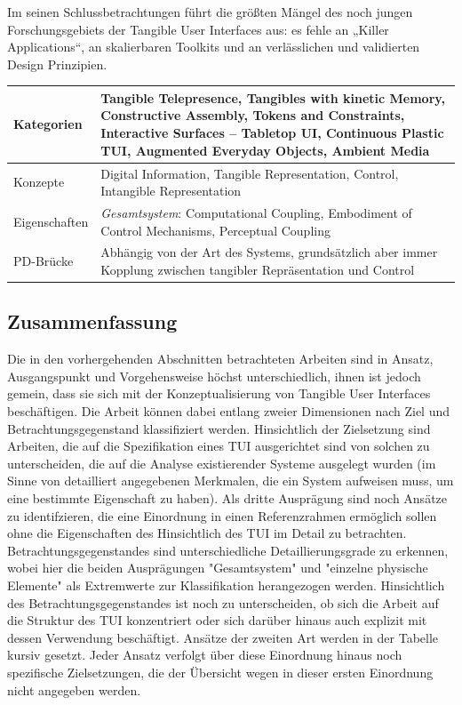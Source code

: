 Im seinen Schlussbetrachtungen führt \citeauthor{Ishii08} die größten Mängel des noch jungen Forschungsgebiets der Tangible User Interfaces aus: es fehle an „Killer Applications“, an skalierbaren Toolkits und an verlässlichen und validierten Design Prinzipien.

\begin{tabular}{| p{3cm} | p{10cm} |}
  \hline
  Kategorien & Tangible Telepresence, Tangibles with kinetic Memory, Constructive Assembly, Tokens and Constraints, Interactive Surfaces -- Tabletop UI, Continuous Plastic TUI, Augmented Everyday Objects, Ambient Media \\ \hline
  Konzepte & Digital Information, Tangible Representation, Control, Intangible Representation \\ \hline
  Eigenschaften & \emph{Gesamtsystem}: Computational Coupling, Embodiment of Control Mechanisms, Perceptual Coupling \\ \hline
  PD-Brücke & Abhängig von der Art des Systems, grundsätzlich aber immer Kopplung zwischen tangibler Repräsentation und Control \\ \hline
\end{tabular} 


\subsection{Zusammenfassung} %
\label{sub:tui_konzepte_zusammenfassung}

Die in den vorhergehenden Abschnitten betrachteten Arbeiten sind in Ansatz, Ausgangspunkt und Vorgehensweise höchst unterschiedlich, ihnen ist jedoch gemein, dass sie sich mit der Konzeptualisierung von Tangible User Interfaces beschäftigen. Die Arbeit können dabei entlang zweier Dimensionen nach Ziel und Betrachtungsgegenstand klassifiziert werden. Hinsichtlich der Zielsetzung sind Arbeiten, die auf die Spezifikation eines \gls{TUI} ausgerichtet sind von solchen zu unterscheiden, die auf die Analyse existierender Systeme ausgelegt wurden (im Sinne von detailliert angegebenen Merkmalen, die ein System aufweisen muss, um eine bestimmte Eigenschaft zu haben). Als dritte Ausprägung sind noch Ansätze zu identifzieren, die eine Einordnung in einen Referenzrahmen ermöglich sollen ohne die Eigenschaften des Hinsichtlich des \gls{TUI} im Detail zu betrachten. Betrachtungsgegenstandes sind unterschiedliche Detaillierungsgrade zu erkennen, wobei hier die beiden Ausprägungen "Gesamtsystem" und "einzelne physische Elemente" als Extremwerte zur Klassifikation herangezogen werden. Hinsichtlich des Betrachtungsgegenstandes ist noch zu unterscheiden, ob sich die Arbeit auf die Struktur des \gls{TUI} konzentriert oder sich darüber hinaus auch explizit mit dessen Verwendung beschäftigt. Ansätze der zweiten Art werden in der Tabelle kursiv gesetzt. Jeder Ansatz verfolgt über diese Einordnung hinaus noch spezifische Zielsetzungen, die der Übersicht wegen in dieser ersten Einordnung nicht angegeben werden. 

